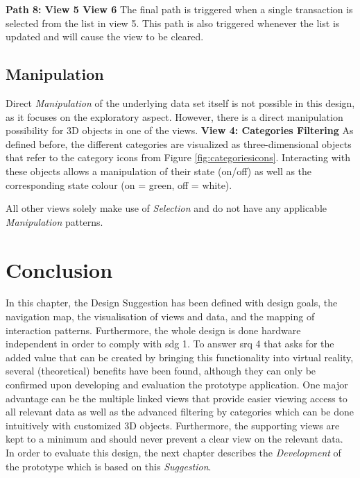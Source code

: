 \textbf{Path 8: View 5 \textrightarrow View 6} \newline
The final path is triggered when a single transaction is selected from the list in view 5. This path is also triggered whenever the list is updated and will cause the view to be cleared.




\subsection{Manipulation}

Direct \textit{Manipulation} of the underlying data set itself is not possible in this design, as it focuses on the exploratory aspect. However, there is a direct manipulation possibility for 3D objects in one of the views.
\textbf{View 4: Categories Filtering} \newline
As defined before, the different categories are visualized as three-dimensional objects that refer to the category icons from Figure \ref{fig:categoriesicons}. Interacting with these objects allows a manipulation of their state (on/off) as well as the corresponding state colour (on = green, off = white).

All other views solely make use of \textit{Selection} and do not have any applicable \textit{Manipulation} patterns.



\section{Conclusion}

In this chapter, the Design Suggestion has been defined with design goals, the navigation map, the visualisation of views and data, and the mapping of interaction patterns. Furthermore, the whole design is done hardware independent in order to comply with \gls{sdg} 1. To answer \gls{srq} 4 that asks for the added value that can be created by bringing this functionality into virtual reality, several (theoretical) benefits have been found, although they can only be confirmed upon developing and evaluation the prototype application. One major advantage can be the multiple linked views that provide easier viewing access to all relevant data as well as the advanced filtering by categories which can be done intuitively with customized 3D objects. Furthermore, the supporting views are kept to a minimum and should never prevent a clear view on the relevant data. \newline
In order to evaluate this design, the next chapter describes the \textit{Development} of the prototype which is based on this \textit{Suggestion}.
